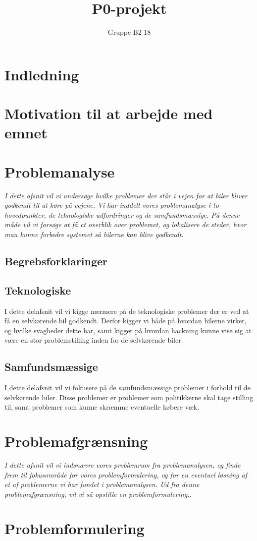 \documentclass[12pt,hidelinks]{article}
\begin{document}
    \sloppy
	\title{P0-projekt}
	\author{Gruppe B2-18}
	\maketitle
	\newpage
	\tableofcontents
	\newpage
	\section{Indledning}
	\section{Motivation til at arbejde med emnet}
	
	\section{Problemanalyse}
	\textit{I dette afsnit vil vi undersøge hvilke problemer der står i vejen for at biler bliver godkendt til at køre på vejene. Vi har inddelt vores problemanalyse i to hovedpunkter, de teknologiske udfordringer og de samfundsmæssige. På denne måde vil vi forsøge at få et overblik over problemet, og lokalisere de steder, hvor man kunne forbedre systemet så bilerne kan blive godkendt.}
	\subsection{Begrebsforklaringer}
	
	\subsection{Teknologiske}
	I dette delafsnit vil vi kigge nærmere på de teknologiske problemer der er ved at få en selvkørende bil godkendt. Derfor kigger vi både på hvordan bilerne virker, og hvilke svagheder dette har, samt kigger på hvordan hackning kunne vise sig at være en stor problemstilling inden for de selvkørende biler.
	
	
	
    
	\subsection{Samfundsmæssige}
	I dette delafsnit vil vi fokusere på de samfundsmæssige problemer i forhold til de selvkørende biler. Disse problemer er problemer som politikkerne skal tage stilling til, samt problemer som kunne skræmme eventuelle købere væk.
	
	
	\section{Problemafgrænsning}
	\textit{I dette afsnit vil vi indsnævre vores problemrum fra problemanalysen, og finde frem til fokusområde for vores problemformulering, og for en eventuel løsning af et af problemerne vi har fundet i problemanalysen. Ud fra denne problemafgrænsning, vil vi så opstille en problemformulering.}.
	
	\section{Problemformulering}
	
	
\end{document}
